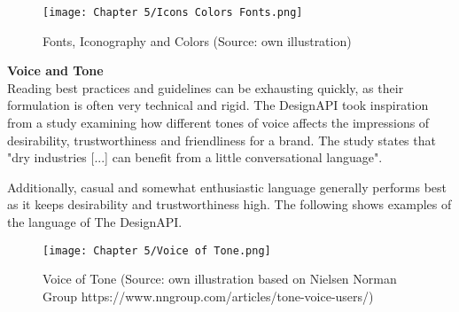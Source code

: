 \begin{figure}[H]
      \centering
      \texttt{[image: Chapter 5/Icons Colors Fonts.png]}
      \caption{Fonts, Iconography and Colors (Source: own illustration)}
\end{figure}


\textbf{Voice and Tone}\\
Reading best practices and guidelines can be exhausting quickly, as their formulation is often very
technical and rigid. The DesignAPI took inspiration from a study examining how different tones of
voice affects the impressions of desirability, trustworthiness and friendliness for a brand.
The study states that "dry industries [...] can benefit from a little conversational language".

Additionally, casual and somewhat enthusiastic language generally performs best as it keeps
desirability and trustworthiness high. 
The following shows examples of the language of The DesignAPI.

\begin{figure}[H]
      \centering
      \texttt{[image: Chapter 5/Voice of Tone.png]}
      \caption{Voice of Tone (Source: own illustration based on Nielsen Norman Group https://www.nngroup.com/articles/tone-voice-users/)}
\end{figure}
